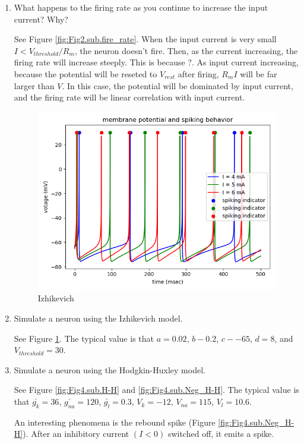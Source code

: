 \documentclass[11pt]{article}
\begin{document}
\begin{enumerate}
		\item What happens to the firing rate as you continue to increase the input current? Why?
		
		See Figure \ref{fig:Fig2.sub.fire_rate}. When the input current is very small $I < V_{threshold}/R_m$, the neuron doesn't fire. Then, as the current increasing, the firing rate will increase steeply. This is because ?. As input current increasing, because the potential will be reseted to $V_{rest}$ after firing, $R_mI$ will be far larger than $V$. In this case, the potential will be dominated by input current, and the firing rate will be linear correlation with input current.
		
		\begin{figure}[htb]
			\centering
			\includegraphics[scale=0.25]{plot_programming_4.png}
			\caption{Izhikevich}
			\label{fig:Fig3.Izh}
		\end{figure}	
		\item Simulate a neuron using the Izhikevich model.
		
		See Figure \ref{fig:Fig3.Izh}. The typical value is that $a = 0.02$, $b - 0.2$, $c - -65$, $d = 8$, and $V_{threshold} = 30$.
		
		\item Simulate a neuron using the Hodgkin-Huxley model.
		
		See Figure \ref{fig:Fig4.sub.H-H} and \ref{fig:Fig4.sub.Neg_H-H}. The typical value is that $\bar{g_k} = 36$, $\bar{g_{na}} = 120$, $\bar{g_l} = 0.3$, $V_k = -12$, $V_{na} = 115$, $V_l = 10.6$.
		
		An interesting phenomena is the rebound spike (Figure \ref{fig:Fig4.sub.Neg_H-H}). After an inhibitory current $(I < 0)$ switched off, it emits a spike. 
		

\end{enumerate}
\end{document}

